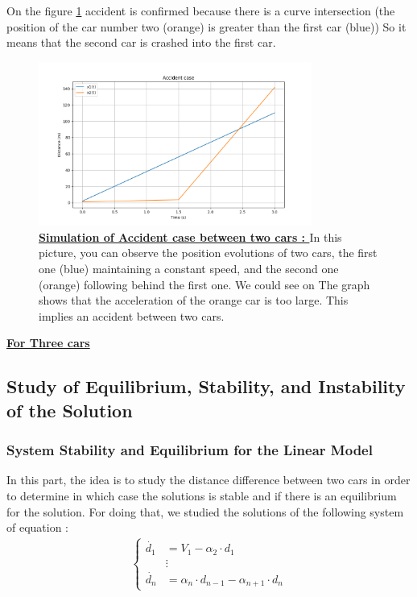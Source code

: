\documentclass{article}
\begin{document}
		On the figure \ref{fig:Acc1} accident is confirmed because there is a curve intersection (the position of the car number two (orange) is greater than the first car (blue)) So it means that the second car is crashed into the first car.
		
		\begin{figure}[H]
			\centering
			\includegraphics[width=0.8\textwidth]{Acc1.png}
			\caption[Simulation of Accident case between two cars]{\textbf{\underline{Simulation of Accident case between two cars : }} In this picture, you can observe the position evolutions of two cars, the first one (blue) maintaining a constant speed, and the second one (orange) following behind the first one. We could see on The graph shows that the acceleration of the orange car is too large. This implies an accident between two cars.}
			\label{fig:Acc1}
		\end{figure}
		
		\textbf{\underline{For Three cars}}
		
		\subsection{Study of Equilibrium, Stability, and Instability of the Solution}
		\subsubsection{System Stability and Equilibrium for the Linear Model}
		In this part, the idea is to study the distance difference between two cars in order to determine in which case the solutions is stable and if there is an equilibrium for the solution.
		For doing that, we studied the solutions of the following  system of equation : 
		\begin{align*}
			\begin{cases}
				\dot{d_1} &= V_1 - \alpha_2 \cdot d_1 \\
				&\vdots \\
				\dot{d_n} &= \alpha_n \cdot d_{n-1} - \alpha_{n+1} \cdot d_n
			\end{cases}
		\end{align*}
		
\end{document}
